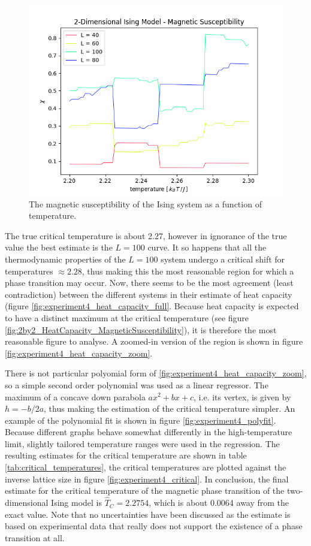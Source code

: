 \documentclass[nofootinbib,reprint,english]{revtex4-1}
\begin{document}
\begin{figure}[h!]
\centering
\includegraphics[scale=0.5]{../output/figures/experiment4/magnetic_susceptibility_full.png}
\caption{The magnetic susceptibility of the Ising system as a function of temperature.}\label{fig:experiment4_magnetic_susceptibility}
\end{figure}

The true critical temperature is about 2.27, however in ignorance of the true value the best estimate is the \(L=100\) curve. It so happens that all the thermodynamic properties of the \(L=100\) system undergo a critical shift for temperatures \(\approx2.28\), thus making this the most reasonable region for which a phase transition may occur. Now, there seems to be the most agreement (least contradiction) between the different systems in their estimate of heat capacity (figure \ref{fig:experiment4_heat_capacity_full}. Because heat capacity is expected to have a distinct maximum at the critical temperature (see figure \ref{fig:2by2_HeatCapacity_MagneticSusceptibility}), it is therefore the most reasonable figure to analyse. A zoomed-in version of the region is shown in figure \ref{fig:experiment4_heat_capacity_zoom}.

There is not particular polyomial form of \ref{fig:experiment4_heat_capacity_zoom}, so a simple second order polynomial was used as a linear regressor. The maximum of a concave down parabola \(ax^2+bx+c\), i.e. its vertex, is given by \(h=-b/2a\), thus making the estimation of the critical temperature simpler. An example of the polynomial fit is shown in figure \ref{fig:experiment4_polyfit}. Because different graphs behave somewhat differently in the high-temperature limit, slightly tailored temperature ranges were used in the regression. The resulting estimates for the critical temperature are shown in table \ref{tab:critical_temperatures}, the critical temperatures are plotted against the inverse lattice size in figure \ref{fig:experiment4_critical}. In conclusion, the final estimate for the critical temperature of the magnetic phase transition of the two-dimensional Ising model is \(\hat{T}_C=2.2754\), which is about 0.0064 away from the exact value. Note that no uncertainties have been discussed as the estimate is based on experimental data that really does not support the existence of a phase transition at all.
\end{document}
